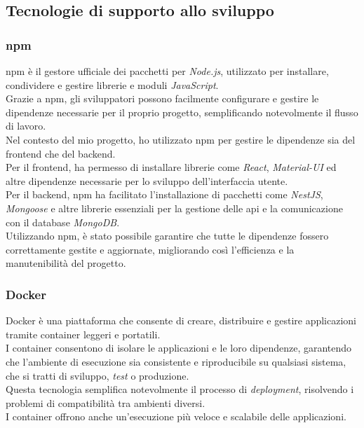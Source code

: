 \subsection{Tecnologie di supporto allo sviluppo}
\label{sez:tecnologie-supporto-sviluppo}


\subsubsection{\gls{npm}}

\gls{npm} è il gestore ufficiale dei pacchetti per \textit{Node.js}, utilizzato per installare, condividere e gestire librerie e moduli \textit{JavaScript}.\\
Grazie a \gls{npm}, gli sviluppatori possono facilmente configurare e gestire le dipendenze necessarie per il proprio progetto, semplificando notevolmente il flusso di lavoro.\\

\noindent Nel contesto del mio progetto, ho utilizzato \gls{npm} per gestire le dipendenze sia del \gls{frontend} che del \gls{backend}.\\
Per il \gls{frontend}, ha permesso di installare librerie come \textit{React}, \textit{Material-UI} ed altre dipendenze necessarie per lo sviluppo dell'interfaccia utente. \\
Per il \gls{backend}, \gls{npm} ha facilitato l'installazione di pacchetti come \textit{NestJS}, \textit{Mongoose} e altre librerie essenziali per la gestione delle \gls{api} e la comunicazione con il database \textit{MongoDB}. \\

\noindent Utilizzando \gls{npm}, è stato possibile garantire che tutte le dipendenze fossero correttamente gestite e aggiornate, migliorando così l'efficienza e la manutenibilità del progetto.

\subsubsection{Docker}

\noindent Docker è una piattaforma che consente di creare, distribuire e gestire applicazioni tramite \gls{container} leggeri e portatili.\\

\noindent I \gls{container} consentono di isolare le applicazioni e le loro dipendenze, garantendo che l'ambiente di esecuzione sia consistente e riproducibile su qualsiasi sistema, che si tratti di sviluppo, \textit{test} o produzione.\\
Questa tecnologia semplifica notevolmente il processo di \textit{deployment}, risolvendo i problemi di compatibilità tra ambienti diversi. \\
I \gls{container} offrono anche un'esecuzione più veloce e scalabile delle applicazioni.\\

